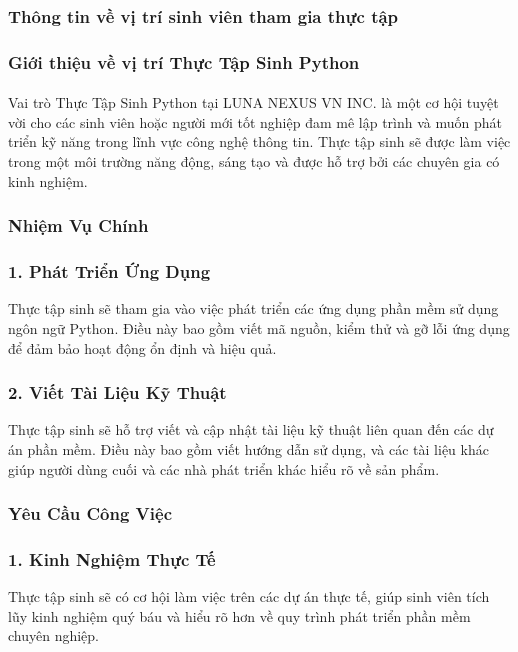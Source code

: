 \begin{flushleft}
		\subsubsection{Thông tin về vị trí sinh viên tham gia thực tập}
		\subsubsection*{Giới thiệu về vị trí Thực Tập Sinh Python}
		\paragraph{}
		\fontsize{14}{20}\selectfont Vai trò Thực Tập Sinh Python tại LUNA NEXUS VN INC. là một cơ hội tuyệt vời cho các sinh viên hoặc người mới tốt nghiệp đam mê lập trình và muốn phát triển kỹ năng trong lĩnh vực công nghệ thông tin. Thực tập sinh sẽ được làm việc trong một môi trường năng động, sáng tạo và được hỗ trợ bởi các chuyên gia có kinh nghiệm.
		\subsubsection*{Nhiệm Vụ Chính}
		\subsubsection*{1. Phát Triển Ứng Dụng}
		\fontsize{14}{20}\selectfont Thực tập sinh sẽ tham gia vào việc phát triển các ứng dụng phần mềm sử dụng ngôn ngữ Python. Điều này bao gồm viết mã nguồn, kiểm thử và gỡ lỗi ứng dụng để đảm bảo hoạt động ổn định và hiệu quả.
		\subsubsection*{2. Viết Tài Liệu Kỹ Thuật}
		\fontsize{14}{20}\selectfont Thực tập sinh sẽ hỗ trợ viết và cập nhật tài liệu kỹ thuật liên quan đến các dự án phần mềm. Điều này bao gồm viết hướng dẫn sử dụng, và các tài liệu khác giúp người dùng cuối và các nhà phát triển khác hiểu rõ về sản phẩm.
		\subsubsection*{Yêu Cầu Công Việc}
		\subsubsection*{1. Kinh Nghiệm Thực Tế}
		\fontsize{14}{20}\selectfont Thực tập sinh sẽ có cơ hội làm việc trên các dự án thực tế, giúp sinh viên tích lũy kinh nghiệm quý báu và hiểu rõ hơn về quy trình phát triển phần mềm chuyên nghiệp.


\end{flushleft}
